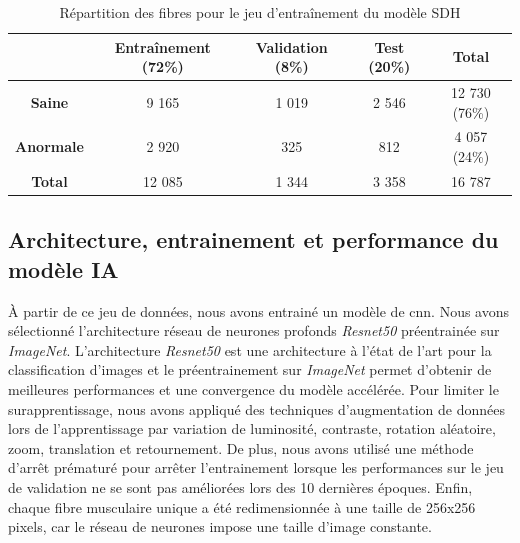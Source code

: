 \begin{table}[!ht]
\centering
\caption{Répartition des fibres pour le jeu d'entraînement du modèle SDH}
\label{tab:sdh_fiber_count}
\begin{tabular}{|c|c|c|c|c|}
\hline
 & \textbf{Entraînement} (72\%) & \textbf{Validation} (8\%) & \textbf{Test} (20\%) & \textbf{Total} \\
\hline
\textbf{Saine} & 9 165 & 1 019 & 2 546 & 12 730 (76\%) \\
\hline
\textbf{Anormale} & 2 920 & 325 & 812 & 4 057 (24\%) \\
\hline
\hline
\textbf{Total} & 12 085 & 1 344 & 3 358 & 16 787 \\
\hline
\end{tabular}
\end{table}


\subsection{Architecture, entrainement et performance du modèle IA}
À partir de ce jeu de données, nous avons entrainé un modèle de \gls{cnn}. Nous avons sélectionné l'architecture réseau de neurones profonds \textit{Resnet50} préentrainée sur \textit{ImageNet}. L'architecture \textit{Resnet50} est une architecture à l'état de l'art pour la classification d'images et le préentrainement sur \textit{ImageNet} permet d'obtenir de meilleures performances et une convergence du modèle accélérée. Pour limiter le surapprentissage, nous avons appliqué des techniques d'augmentation de données lors de l'apprentissage par variation de luminosité, contraste, rotation aléatoire, zoom, translation et retournement. De plus, nous avons utilisé une méthode d'arrêt prématuré pour arrêter l'entrainement lorsque les performances sur le jeu de validation ne se sont pas améliorées lors des 10 dernières époques. Enfin, chaque fibre musculaire unique a été redimensionnée à une taille de 256x256 pixels, car le réseau de neurones impose une taille d'image constante.
